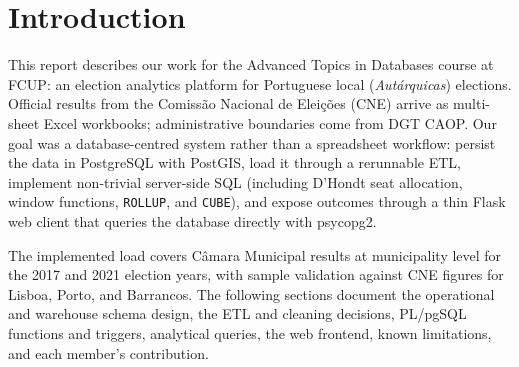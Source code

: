 \section{Introduction}
This report describes our work for the Advanced Topics in Databases course at FCUP: an election analytics platform for Portuguese local (\textit{Aut\'{a}rquicas}) elections. Official results from the Comiss\~{a}o Nacional de Elei\c{c}\~{o}es (CNE) arrive as multi-sheet Excel workbooks; administrative boundaries come from DGT CAOP. Our goal was a database-centred system rather than a spreadsheet workflow: persist the data in PostgreSQL with PostGIS, load it through a rerunnable ETL, implement non-trivial server-side SQL (including D'Hondt seat allocation, window functions, \texttt{ROLLUP}, and \texttt{CUBE}), and expose outcomes through a thin Flask web client that queries the database directly with psycopg2.

The implemented load covers C\^{a}mara Municipal results at municipality level for the 2017 and 2021 election years, with sample validation against CNE figures for Lisboa, Porto, and Barrancos. The following sections document the operational and warehouse schema design, the ETL and cleaning decisions, PL/pgSQL functions and triggers, analytical queries, the web frontend, known limitations, and each member's contribution.
